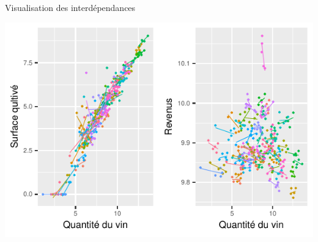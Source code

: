 \documentclass[11pt,ignorenonframetext,]{beamer}
\begin{document}
\begin{frame}{Visualisation des interdépendances}
\protect\hypertarget{visualisation-des-interdependances}{}

\tiny

\begin{center}\includegraphics{Presentation_files/figure-beamer/unnamed-chunk-18-1} \end{center}

\normalsize

\end{frame}
\end{document}
